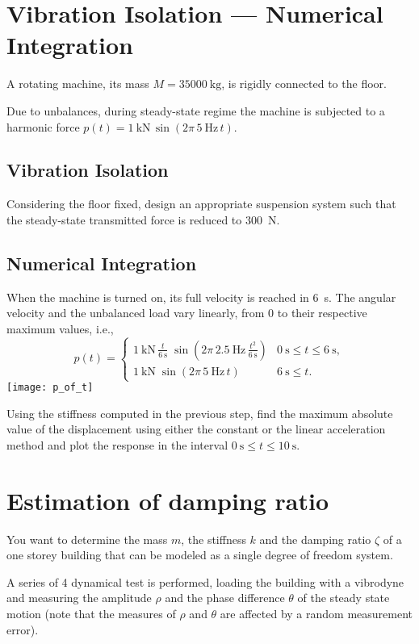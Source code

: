 \documentclass[11pt,a4paper]{article}
\begin{document}
\section{Vibration Isolation --- Numerical Integration} 
A rotating machine, its mass $M=\SI{35000}{\kg}$, is rigidly connected
to the floor.

Due to unbalances, during steady-state regime the machine is subjected
to a harmonic force $p(t)=\SI{1}{\kilo\newton}\,\sin(2\pi\,\SI{5}\hertz\, t)$.

\subsection{Vibration Isolation}
Considering the floor fixed, design an appropriate suspension system
such that the steady-state transmitted force is reduced to
\SI{300}{\newton}.
\subsection{Numerical Integration}
When the machine is turned on, its full velocity is reached in
\SI{6}{\second}.  The angular velocity and the unbalanced load vary
linearly, from $0$ to their respective maximum values, i.e.,
\[p(t)=
\begin{cases}
  \SI{1}{\kilo\newton}\,\frac{t}{\SI{6}\second}\;
  \sin\left(2\pi\,\SI{2.5}{\hertz}\,\frac{t^2}{\SI{6}{\second}}\right) &  \SI{0}\second \le t \le \SI{6}\second,\\
  \SI{1}{\kilo\newton}\;\sin(2\pi\,\SI{5}{\hertz}\, t) &  \SI{6}\second\le t.
\end{cases}
\]
\texttt{[image: p\_of\_t]}

\bigskip\noindent Using the stiffness computed in the previous step,
find  the maximum absolute value of the displacement using either
the constant or the linear acceleration method and plot the response
in the interval $\SI{0}\second \le t \le \SI{10}\second$.
%
\section{Estimation of damping ratio}
You want to determine the mass $m$, the stiffness $k$ and the damping
ratio $\zeta$ of a one storey building that can be modeled as a single
degree of freedom system.

A series of 4 dynamical test is performed, loading the building with a
vibrodyne and measuring the amplitude $\rho$ and the phase difference
$\theta$ of the steady state motion (note that the measures of $\rho$
and $\theta$ are affected by a random measurement error).
\end{document}
